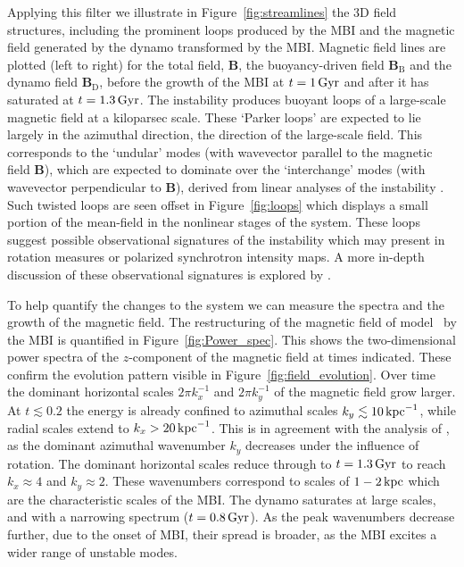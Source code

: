 \documentclass[fleqn,usenatbib]{mnras}
\newcommand{\RSOBSD}{{\sf{O60q0.3}}}
\newcommand\D{_\text{D}} %
\renewcommand\vec[1]{\bm{#1}}%
\newcommand{\BB}{\vec{B}} %
\newcommand{\kpc}{\,{\rm kpc}}  %
\newcommand{\Gyr}{\,{\rm Gyr}}  %
\begin{document}
{Applying this filter we} illustrate {in Figure~\ref{fig:streamlines}}
the {3D} field structures, including the prominent loops produced by the MBI
and the magnetic field generated by the dynamo transformed by the MBI.
{Magnetic field lines are plotted (left to right) for the total field,
$\BB$, the buoyancy-driven field $\BB_\text{B}$ and the dynamo field
$\vec{B}\D$, before the growth of the MBI at $t=1\Gyr$ and after it has
saturated at $t=1.3\Gyr$.} The instability produces buoyant loops of a
large-scale magnetic field at a kiloparsec scale. These `Parker loops' are
expected to lie largely in the azimuthal direction, the direction of the
large-scale field.  This corresponds to the `undular' modes (with wavevector
parallel to the magnetic field $\BB$), which are expected to dominate over the
`interchange' modes (with wavevector perpendicular to $\BB$), derived from
linear analyses of the instability \citep[see, e.g.,][]{MTSK1993}. Such twisted
loops are seen offset in Figure~\ref{fig:loops} which displays a small portion
of the mean-field in the nonlinear stages of the system. These loops suggest
possible observational signatures of the instability which may present in
rotation measures or polarized synchrotron intensity maps. A more in-depth
discussion of these observational signatures is explored by
\citet{Luiz_R_2015a}.

{To help quantify the changes to the system we can measure the spectra and
the growth of the magnetic field.} The restructuring of the magnetic field of
model \RSOBSD\ by the MBI is quantified in Figure~\ref{fig:Power_spec}. This
shows the two-dimensional power spectra of the $z$-component of the magnetic
field at times indicated.  These confirm the evolution pattern visible in
Figure~\ref{fig:field_evolution}. Over time the dominant horizontal scales
$2\pi k_x^{-1}$ and $2\pi k_y^{-1}$ of the magnetic field grow larger.  At
$t\lesssim 0.2$ the energy is {already} confined to azimuthal scales
$k_y\lesssim 10\kpc^{-1}$, {while} radial scales extend to
$k_x>20\kpc^{-1}$. This is in agreement with the analysis of \citet{S1974}, as
the dominant azimuthal wavenumber $k_y$ decreases under the influence of
rotation. The dominant horizontal scales reduce through to $t=1.3\Gyr$ to reach
$k_x\approx 4$ and $k_y\approx 2$.  These wavenumbers correspond to scales of
$1-2\kpc$ which are the characteristic scales of the MBI.  The dynamo saturates
at large scales, and with a narrowing spectrum ($t=0.8\Gyr$). As the peak
wavenumbers decrease further, due to the onset of MBI, their spread is broader,
as the MBI excites a wider range of unstable modes.
\end{document}
